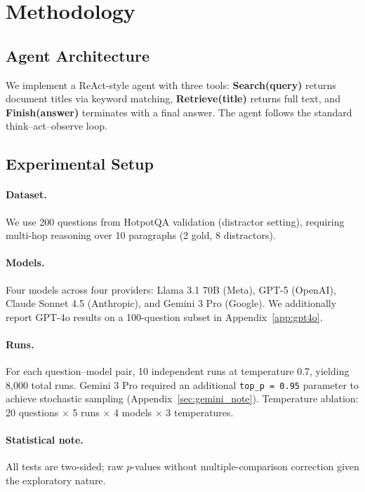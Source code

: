 \documentclass{article}
\begin{document}
\section{Methodology}

\subsection{Agent Architecture}

We implement a ReAct-style agent with three tools: \textbf{Search(query)} returns document titles via keyword matching, \textbf{Retrieve(title)} returns full text, and \textbf{Finish(answer)} terminates with a final answer. The agent follows the standard think--act--observe loop.

\subsection{Experimental Setup}

\paragraph{Dataset.} We use 200 questions from HotpotQA \citep{yang2018hotpotqa} validation (distractor setting), requiring multi-hop reasoning over 10 paragraphs (2 gold, 8 distractors).

\paragraph{Models.} Four models across four providers: Llama 3.1 70B (Meta), GPT-5 (OpenAI), Claude Sonnet 4.5 (Anthropic), and Gemini 3 Pro (Google). We additionally report GPT-4o results on a 100-question subset in Appendix~\ref{app:gpt4o}.

\paragraph{Runs.} For each question--model pair, 10 independent runs at temperature 0.7, yielding 8,000 total runs. Gemini 3 Pro required an additional \texttt{top\_p\,=\,0.95} parameter to achieve stochastic sampling (Appendix~\ref{sec:gemini_note}). Temperature ablation: 20 questions $\times$ 5 runs $\times$ 4 models $\times$ 3 temperatures.

\paragraph{Statistical note.} All tests are two-sided; raw $p$-values without multiple-comparison correction given the exploratory nature.
\end{document}
